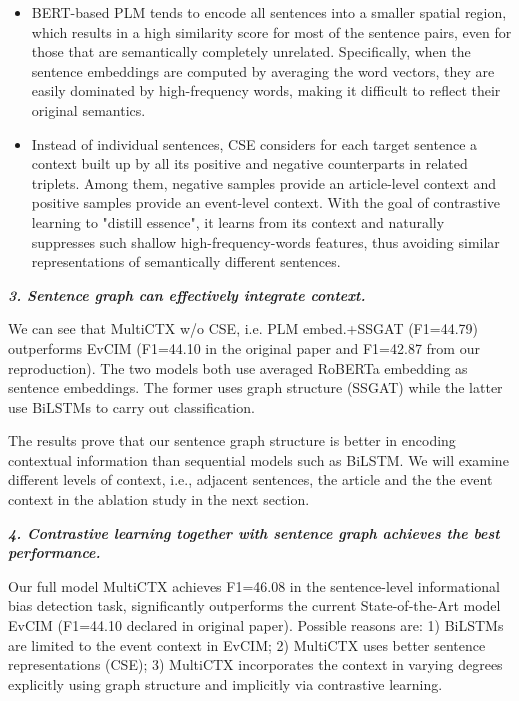 \begin{itemize}
    \item BERT-based PLM tends to encode all sentences into a smaller spatial region, which results in a high similarity score for most of the sentence pairs, even for those that are semantically completely unrelated. Specifically, when the sentence embeddings are computed by averaging the word vectors, they are easily dominated by high-frequency words, making it difficult to reflect their original semantics.
    \item Instead of individual sentences, CSE considers for each target sentence a context built up by all its positive and negative counterparts in related triplets. Among them, negative samples provide an article-level context and positive samples provide an event-level context. With the goal of contrastive learning to "distill essence", it learns from its context and naturally suppresses such shallow high-frequency-words features, thus avoiding similar representations of semantically different sentences. 
\end{itemize}





\textit{\textbf{3. Sentence graph can effectively integrate context.}}


We can see that MultiCTX w/o CSE, i.e. PLM embed.+SSGAT (F1=44.79) outperforms EvCIM (F1=44.10 in the original paper and F1=42.87 from our reproduction). The two models both use averaged RoBERTa embedding as sentence embeddings. The former uses graph structure (SSGAT) while the latter use BiLSTMs to carry out classification. 

The results prove that our sentence graph structure is better in encoding contextual information than sequential models such as BiLSTM. We will examine different levels of context, i.e., adjacent sentences, the article and the the event context in the ablation study in the next section.


 
\textit{\textbf{4. Contrastive learning together with sentence graph achieves the best performance.}}

Our full model MultiCTX achieves F1=46.08 in the sentence-level informational bias detection task, significantly outperforms the current State-of-the-Art model EvCIM \citep{cohan-etal-2019-pretrained} (F1=44.10 declared in original paper). Possible reasons are: 1) BiLSTMs are limited to the event context in EvCIM; 2) MultiCTX uses better sentence representations (CSE); 3) MultiCTX incorporates the context in varying degrees explicitly using graph structure and implicitly via contrastive learning.